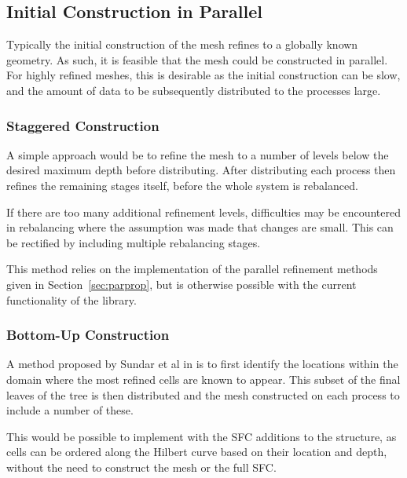 \documentclass[twoside]{IIBproject}
\numberwithin{figure}{section}
\begin{document}


    \subsection{Initial Construction in Parallel} %
        \label{sec:parinit}

        Typically the initial construction of the mesh refines to a globally known geometry. As such, it is feasible that the mesh could be constructed in parallel. For highly refined meshes, this is desirable as the initial construction can be slow, and the amount of data to be subsequently distributed to the processes large. 

        \subsubsection{Staggered Construction}
            \label{sec:parainit-staggered}

            A simple approach would be to refine the mesh to a number of levels below the desired maximum depth before distributing. After distributing each process then refines the remaining stages itself, before the whole system is rebalanced. 

            If there are too many additional refinement levels, difficulties may be encountered in rebalancing where the assumption was made that changes are small. This can be rectified by including multiple rebalancing stages.

            This method relies on the implementation of the parallel refinement methods given in Section~\ref{sec:parprop}, but is otherwise possible with the current functionality of the library. 



        \subsubsection{Bottom-Up Construction}
            \label{sec:parainit-bottomup}

            A method proposed by Sundar et al in \cite{sundar2008} is to first identify the locations within the domain where the most refined cells are known to appear. This subset of the final leaves of the tree is then distributed and the mesh constructed on each process to include a number of these. 

            This would be possible to implement with the SFC additions to the structure, as cells can be ordered along the Hilbert curve based on their location and depth, without the need to construct the mesh or the full SFC.
\end{document}
